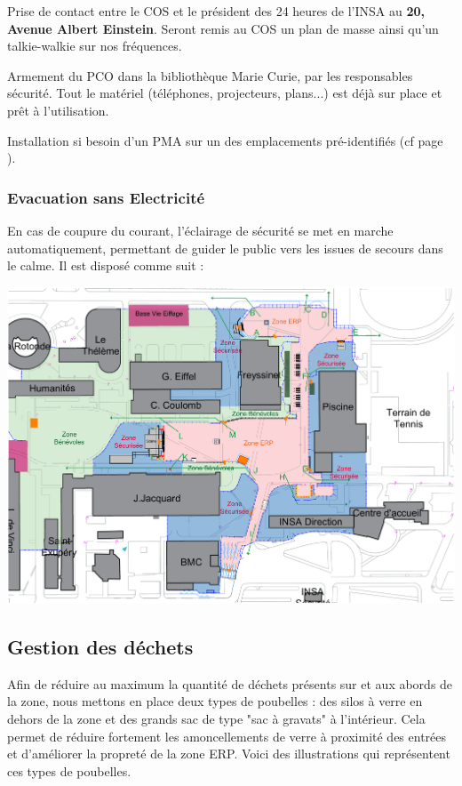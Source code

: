 \documentclass[hidelinks, paper=a4, fontsize=13pt]{report}
\begin{document}
\begin{list}{•}{}
	\item Prise de contact entre le COS et le président des 24 heures de l'INSA au \textbf{20, Avenue Albert Einstein}. Seront remis au COS un plan de masse ainsi qu’un talkie-walkie sur nos fréquences.
	\item Armement du PCO dans la bibliothèque Marie Curie, par les responsables sécurité. Tout le matériel (téléphones, projecteurs, plans...) est déjà sur place et prêt à l'utilisation. 
	\item Installation si besoin d’un PMA sur un des emplacements pré-identifiés (cf page \pageref{refEmplacementPMA}).
\end{list}


\subsubsection{Evacuation sans Electricité}
En cas de coupure du courant, l’éclairage de sécurité se met en marche automatiquement, permettant de guider le public vers les issues de secours dans le calme. Il est disposé comme suit :
\begin{center}
	\includegraphics[width=.8\textwidth,keepaspectratio]{Exports/Plan_24h_44eme-Blocs_Phares}
\end{center}

\subsection{Gestion des déchets}
\label{gestion_dechets}

Afin de réduire au maximum la quantité de déchets présents sur et aux abords de la zone, nous mettons en place deux types de poubelles : des silos à verre en dehors de la zone et des grands sac de type "sac à gravats" à l'intérieur. Cela permet de réduire fortement les amoncellements de verre à proximité des entrées et d'améliorer la propreté de la zone ERP. Voici des illustrations qui représentent ces types de poubelles.
\end{document}
